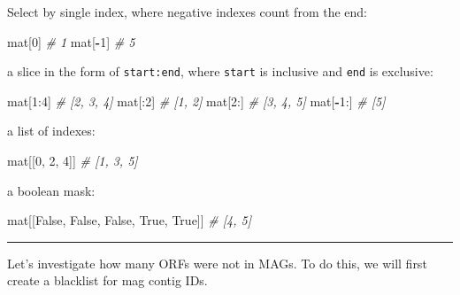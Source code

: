 \documentclass[
]{book}
\newenvironment{Shaded}{\begin{snugshade}}{\end{snugshade}}
\newcommand{\CommentTok}[1]{\textcolor[rgb]{0.56,0.35,0.01}{\textit{#1}}}
\newcommand{\DecValTok}[1]{\textcolor[rgb]{0.00,0.00,0.81}{#1}}
\newcommand{\NormalTok}[1]{#1}
\newcommand{\OperatorTok}[1]{\textcolor[rgb]{0.81,0.36,0.00}{\textbf{#1}}}
\newcommand{\VariableTok}[1]{\textcolor[rgb]{0.00,0.00,0.00}{#1}}
\begin{document}
Select by single index, where negative indexes count from the end:

\begin{Shaded}
\begin{Highlighting}[numbers=left,,]
\NormalTok{mat[}\DecValTok{0}\NormalTok{]      }\CommentTok{\# 1}
\NormalTok{mat[}\OperatorTok{{-}}\DecValTok{1}\NormalTok{]     }\CommentTok{\# 5}
\end{Highlighting}
\end{Shaded}

a slice in the form of \texttt{start:end}, where \texttt{start} is inclusive and \texttt{end} is exclusive:

\begin{Shaded}
\begin{Highlighting}[numbers=left,,]
\NormalTok{mat[}\DecValTok{1}\NormalTok{:}\DecValTok{4}\NormalTok{]    }\CommentTok{\# [2, 3, 4]}
\NormalTok{mat[:}\DecValTok{2}\NormalTok{]     }\CommentTok{\# [1, 2]}
\NormalTok{mat[}\DecValTok{2}\NormalTok{:]     }\CommentTok{\# [3, 4, 5]}
\NormalTok{mat[}\OperatorTok{{-}}\DecValTok{1}\NormalTok{:]    }\CommentTok{\# [5]}
\end{Highlighting}
\end{Shaded}

a list of indexes:

\begin{Shaded}
\begin{Highlighting}[numbers=left,,]
\NormalTok{mat[[}\DecValTok{0}\NormalTok{, }\DecValTok{2}\NormalTok{, }\DecValTok{4}\NormalTok{]] }\CommentTok{\# [1, 3, 5]}
\end{Highlighting}
\end{Shaded}

a boolean mask:

\begin{Shaded}
\begin{Highlighting}[numbers=left,,]
\NormalTok{mat[[}\VariableTok{False}\NormalTok{, }\VariableTok{False}\NormalTok{, }\VariableTok{False}\NormalTok{, }\VariableTok{True}\NormalTok{, }\VariableTok{True}\NormalTok{]] }\CommentTok{\# [4, 5]}
\end{Highlighting}
\end{Shaded}

\begin{center}\rule{0.5\linewidth}{0.5pt}\end{center}

Let's investigate how many ORFs were not in MAGs. To do this, we will first create a blacklist for mag contig IDs.
\end{document}

